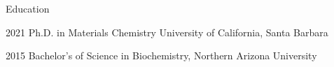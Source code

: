 
\begin{vitae}

    \begin{vitaesection}{Education}
        \vspace{-0.1in}
        \item [2021] Ph.D. in Materials Chemistry University of California, Santa Barbara
        \item [2015] Bachelor's of Science in Biochemistry, Northern Arizona University
    \end{vitaesection}

\end{vitae}